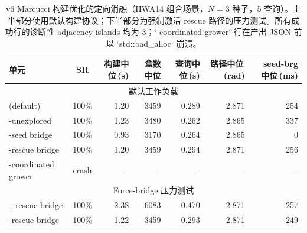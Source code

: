 \begin{table}[t]
\centering
\caption{v6 Marcucci 构建优化的定向消融（IIWA14 组合场景，$N=3$ 种子，5 查询）。上半部分使用默认构建协议；下半部分为强制激活 rescue 路径的压力测试。所有成功行的诊断性 adjacency islands 均为 3；`-coordinated grower` 行在产出 JSON 前以 `std::bad_alloc` 崩溃。}
\label{tab:v6_optim_ablation}
\begin{tabular}{lcrrrrr}
\toprule
单元 & SR & 构建中位\,(s) & 盒数中位 & 查询中位\,(s) & 路径中位\,(rad) & seed-brg 中位\,(ms)\\
\midrule
\multicolumn{7}{c}{默认工作负载}\\
\midrule
(default) & 100\% & 1.20 & 3459 & 0.289 & 2.871 & 254\\
-unexplored & 100\% & 1.23 & 3480 & 0.262 & 2.865 & 337\\
-seed bridge & 100\% & 0.93 & 3170 & 0.264 & 2.865 & 0\\
-rescue bridge & 100\% & 1.20 & 3459 & 0.294 & 2.871 & 256\\
-coordinated grower & crash & -- & -- & -- & -- & --\\
\midrule
\multicolumn{7}{c}{Force-bridge 压力测试}\\
\midrule
+rescue bridge & 100\% & 2.38 & 6083 & 0.470 & 2.871 & 257\\
-rescue bridge & 100\% & 1.22 & 3459 & 0.293 & 2.871 & 249\\
\bottomrule
\end{tabular}
\end{table}